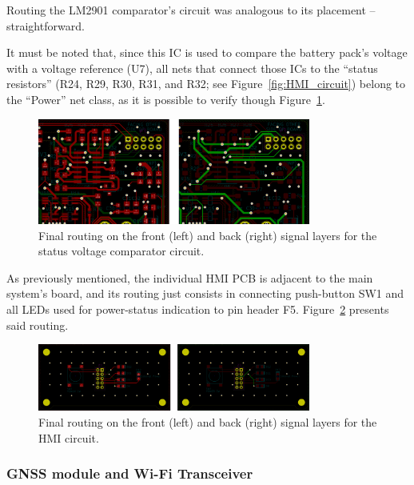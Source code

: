 Routing the LM2901 comparator's circuit was analogous to its placement -- straightforward.

It must be noted that, since this IC is used to compare the battery pack's voltage with a voltage reference (U7), all nets that connect those ICs to the ``status resistors'' (R24, R29, R30, R31, and R32; see Figure~\ref{fig:HMI_circuit}) belong to the ``Power'' net class, as it is possible to verify though Figure~\ref{fig:5_routing_HMI_FCu_1}.

\begin{figure}[h]
	\centering
	\includegraphics[width=0.8\textwidth]{Chapters/Figures/chapter5/5_routing_HMI_FCu_1.png}
	\caption{Final routing on the front (left) and back (right) signal layers for the status voltage comparator circuit.}
	\label{fig:5_routing_HMI_FCu_1}
\end{figure}

As previously mentioned, the individual HMI PCB is adjacent to the main system's board, and its routing just consists in connecting push-button SW1 and all LEDs used for power-status indication to pin header F5. Figure~\ref{fig:5_routing_HMI_FCu_2} presents said routing.

\begin{figure}[h]
	\centering
	\includegraphics[width=0.8\textwidth]{Chapters/Figures/chapter5/5_routing_HMI_FCu_2.png}
	\caption{Final routing on the front (left) and back (right) signal layers for the HMI circuit.}
	\label{fig:5_routing_HMI_FCu_2}
\end{figure}


\subsubsection{GNSS module and Wi-Fi Transceiver}\label{sec:527_ZED_XBEE}

